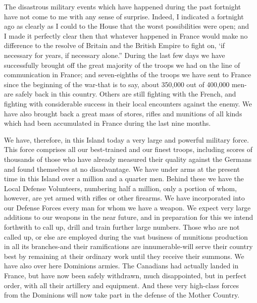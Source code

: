 \documentclass[a4paper]{amsbook}
\begin{document}
The disastrous military events which have happened during the past fortnight have not come to me with any sense of surprise. Indeed, I indicated a fortnight ago as clearly as I could to the House that the worst possibilities were open; and I made it perfectly clear then that whatever happened in France would make no difference to the resolve of Britain and the British Empire to fight on, ‘if necessary for years, if necessary alone.” During the last few days we have successfully brought off the great majority of the troops we had on the line of communication in France; and seven-eighths of the troops we have sent to France since the beginning of the war-that is to say, about 350,000 out of 400,000 men-are safely back in this country. Others are still fighting with the French, and fighting with considerable success in their local encounters against the enemy. We have also brought back a great mass of stores, rifles and munitions of all kinds which had been accumulated in France during the last nine months.

We have, therefore, in this Island today a very large and powerful military force. This force comprises all our best-trained and our finest troops, including scores of thousands of those who have already measured their quality against the Germans and found themselves at no disadvantage. We have under arms at the present time in this Island over a million and a quarter men. Behind these we have the Local Defense Volunteers, numbering half a million, only a portion of whom, however, are yet armed with rifles or other firearms. We have incorporated into our Defense Forces every man for whom we have a weapon. We expect very large additions to our weapons in the near future, and in preparation for this we intend forthwith to call up, drill and train further large numbers. Those who are not called up, or else are employed during the vast business of munitions production in all its branches-and their ramifications are innumerable-will serve their country best by remaining at their ordinary work until they receive their summons. We have also over here Dominions armies. The Canadians had actually landed in France, but have now been safely withdrawn, much disappointed, but in perfect order, with all their artillery and equipment. And these very high-class forces from the Dominions will now take part in the defense of the Mother Country.
\end{document}

